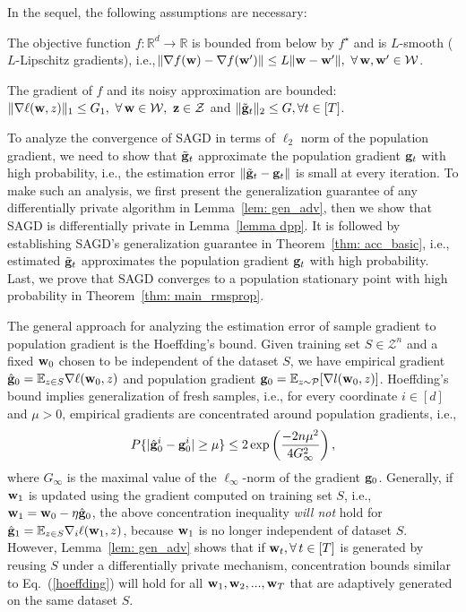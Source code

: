 \documentclass[11pt]{article}
\begin{document}
In the sequel, the following assumptions are necessary:
\begin{assumption}
The objective function $ f: \mathbb{R}^d \rightarrow \mathbb{R}$ is bounded from below by $f^\star$ and is $L$-smooth ($L$-Lipschitz gradients), i.e.,$\nr \|\nabla f(\w) -\nabla f(\w^\prime) \|\leq L \|\w-\w^\prime \|, ~ \forall\, \w, \w^\prime \in \cW$.
\end{assumption}
\begin{assumption}
The gradient of $f$ and its noisy approximation are bounded: $\|\nabla \ell (\w, z) \|_1 \leq G_1, \ \forall\,\w \in \cW, \  \z \in \cZ$ and $\|\tilde {\mathbf{g}}_t\|_2 \leq G, \forall t \in [T]$.
\end{assumption}
To analyze the convergence of \textsc{SAGD} in terms of $\ell_2$ norm of the population gradient, we need to 
show that $\tilde {\mathbf{g}}_t$ approximate the population gradient $\mathbf{g}_t$ with high probability, i.e., the estimation error $\| \tilde {\mathbf{g}}_t - \mathbf{g}_t\|$ is small at every iteration.  To make such an analysis, we first present the generalization guarantee of any differentially private algorithm in Lemma~\ref{lem: gen_adv}, then we show that \textsc{SAGD} is differentially private in Lemma~\ref{lemma dpp}. It is followed by establishing \textsc{SAGD}'s generalization guarantee in Theorem~\ref{thm: acc_basic}, i.e., estimated $\tilde {\mathbf{g}}_t$ approximates the population gradient $\mathbf{g}_t$ with high probability. Last, we prove that \textsc{SAGD} converges to a population stationary point with high probability in Theorem~\ref{thm: main_rmsprop}.


The general approach for analyzing the estimation error of sample gradient to population gradient is the Hoeffding’s bound. 
Given training set $S \in \mathcal{Z}^n$ and a fixed $\mathbf{w}_0$ chosen to be independent of the dataset $S$,  we have empirical gradient $\hat {\mathbf{g}}_0= \mathbb{E}_{z \in S}\nabla \ell(\mathbf{w}_0,z)$ and population gradient $\mathbf{g}_0 = \mathbb{E}_{z\sim \mathcal{P}}[\nabla l(\mathbf{w}_0,z)]$. Hoeffding’s bound implies generalization of fresh samples, i.e., for every coordinate $i \in [d]$ and $\mu > 0$,  empirical gradients are concentrated around population gradients, i.e., 
	\begin{equation} \label{hoeffding}
	P\{|\hat {\mathbf{g}}^i_0 - \mathbf{g}_0^i | \geq \mu \} \leq2 \exp \left(\frac{-2n\mu^2}{4G_\infty^2} \right),
	\end{equation}
 where $G_\infty$ is the maximal value of the $\ell_\infty$-norm of the gradient $ \mathbf{g}_0$. Generally, if $\mathbf{w}_1$ is updated using the gradient computed on training set $S$, i.e., $\mathbf{w}_1 = \mathbf{w}_0 - \eta \hat {\mathbf{g}}_0$, the above concentration inequality \emph{will not} hold for $\hat {\mathbf{g}}_1 = \mathbb{E}_{z \in S}\nabla_i \ell(\mathbf{w}_1,z)$, because $\mathbf{w}_1$ is no longer independent of dataset $S$. However, Lemma~\ref{lem: gen_adv} shows that if $\mathbf{w}_t, \forall\, t \in [T]$ is generated by reusing $S$ under a differentially private mechanism, concentration bounds similar to Eq.~(\ref{hoeffding}) will hold for all $\mathbf{w}_1, \mathbf{w}_2,...,\mathbf{w}_T$ that are adaptively generated on the same dataset $S$. 
\end{document}
